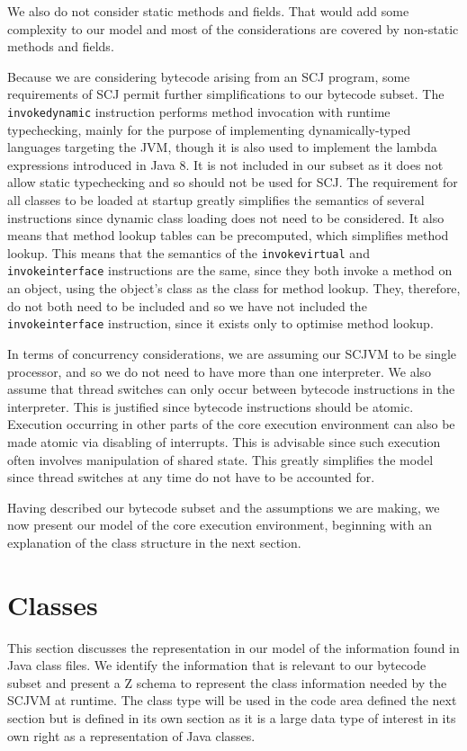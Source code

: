 We also do not consider static methods and fields.
That would add some complexity to our model and most of the
considerations are covered by non-static methods and fields.

Because we are considering bytecode arising from an SCJ program, some
requirements of SCJ permit further simplifications to our bytecode
subset.
The \texttt{invokedynamic} instruction performs method invocation with
runtime typechecking, mainly for the purpose of implementing
dynamically-typed languages targeting the JVM, though it is also used
to implement the lambda expressions introduced in Java 8.
It is not included in our subset as it does not allow static
typechecking and so should not be used for SCJ.
The requirement for all classes to be loaded at startup greatly
simplifies the semantics of several instructions since dynamic class
loading does not need to be considered.
It also means that method lookup tables can be precomputed, which
simplifies method lookup.
This means that the semantics of the \texttt{invokevirtual} and
\texttt{invokeinterface} instructions are the same, since they both
invoke a method on an object, using the object's class as the class
for method lookup.
They, therefore, do not both need to be included and so we have not
included the \texttt{invokeinterface} instruction, since it exists
only to optimise method lookup.

In terms of concurrency considerations, we are assuming our SCJVM to
be single processor, and so we do not need to have more than one
interpreter.
We also assume that thread switches can only occur between bytecode
instructions in the interpreter.
This is justified since bytecode instructions should be atomic.
Execution occurring in other parts of the core execution environment
can also be made atomic via disabling of interrupts.
This is advisable since such execution often involves manipulation of
shared state.
This greatly simplifies the model since thread switches at any time do
not have to be accounted for.

Having described our bytecode subset and the assumptions we are
making, we now present our model of the core execution environment,
beginning with an explanation of the class structure in the next
section.

\section{Classes}
\label{cee-classes-section}

This section discusses the representation in our model of the
information found in Java class files.
We identify the information that is relevant to our bytecode subset
and present a Z schema to represent the class information needed by
the SCJVM at runtime.
The class type will be used in the code area defined the next section
but is defined in its own section as it is a large data type of
interest in its own right as a representation of Java classes.

